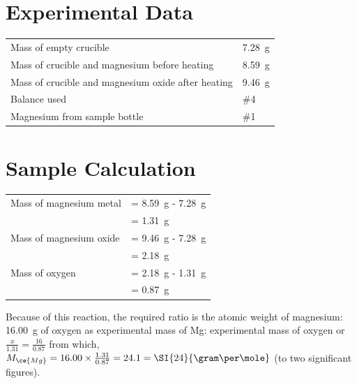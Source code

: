 \documentclass{article}
\begin{document}

\section{Experimental Data}

\begin{tabular}{ll}
Mass of empty crucible & \SI{7.28}{\gram}\\
Mass of crucible and magnesium before heating & \SI{8.59}{\gram}\\
Mass of crucible and magnesium oxide after heating & \SI{9.46}{\gram}\\
Balance used & \#4\\
Magnesium from sample bottle & \#1
\end{tabular}


\section{Sample Calculation}

\begin{tabular}{ll}
Mass of magnesium metal & = \SI{8.59}{\gram} - \SI{7.28}{\gram}\\
& = \SI{1.31}{\gram}\\
Mass of magnesium oxide & = \SI{9.46}{\gram} - \SI{7.28}{\gram}\\
& = \SI{2.18}{\gram}\\
Mass of oxygen & = \SI{2.18}{\gram} - \SI{1.31}{\gram}\\
& = \SI{0.87}{\gram}
\end{tabular}

Because of this reaction, the required ratio is the atomic weight of magnesium: \SI{16.00}{\gram} of oxygen as experimental mass of Mg: experimental mass of oxygen or $\frac{x}{1.31}=\frac{16}{0.87}$ from which, $M_{\ce{Mg}} = 16.00 \times \frac{1.31}{0.87} = 24.1 = \SI{24}{\gram\per\mole}$ (to two significant figures).

\end{document}
